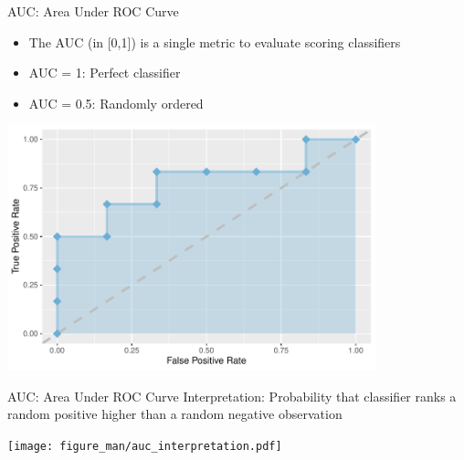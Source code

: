 \documentclass[11pt,compress,t,notes=noshow, xcolor=table]{beamer}
\newenvironment{knitrout}{}{} %
\begin{document}
\begin{vbframe}{AUC: Area Under ROC Curve}

\begin{itemize}
  \item The AUC (in [0,1]) is a single metric to evaluate scoring classifiers
  \item AUC = 1: Perfect classifier
  \item AUC = 0.5: Randomly ordered
\end{itemize}
\begin{knitrout}\scriptsize
{}\color{fgcolor}

{\centering \includegraphics[width=0.8\textwidth]{figure/eval_mclass_roc_sp_12_1} 

}



\end{knitrout}
\end{vbframe}


\begin{vbframe}{AUC: Area Under ROC Curve}
Interpretation: Probability that classifier ranks a random positive higher than a random negative observation

\begin{center}
\texttt{[image: figure\_man/auc\_interpretation.pdf]}
\end{center}

\end{vbframe}
\end{document}
